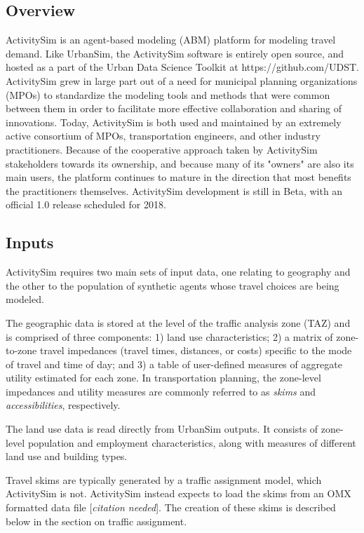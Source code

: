 \subsection{Overview}

ActivitySim is an agent-based modeling (ABM) platform for modeling travel demand. Like UrbanSim, the ActivitySim software is entirely open source, and hosted as a part of the Urban Data Science Toolkit at  https://github.com/UDST. ActivitySim grew in large part out of a need for municipal planning organizations (MPOs) to standardize the modeling tools and methods that were common between them in order to facilitate more effective collaboration and sharing of innovations. Today, ActivitySim is both used and maintained by an extremely active consortium of MPOs, transportation engineers, and other industry practitioners. Because of the cooperative approach taken by ActivitySim stakeholders towards its ownership, and because many of its "owners" are also its main users, the platform continues to mature in the direction that most benefits the practitioners themselves. ActivitySim development is still in Beta, with an official 1.0 release scheduled for 2018.

\subsection{Inputs}

ActivitySim requires two main sets of input data, one relating to geography and the other to the population of synthetic agents whose travel choices are being modeled. 
    
The geographic data is stored at the level of the traffic analysis zone (TAZ) and is comprised of three components: 1) land use characteristics; 2) a matrix of zone-to-zone travel impedances (travel times, distances, or costs) specific to the mode of travel and time of day; and 3) a table of user-defined measures of aggregate utility estimated for each zone. In transportation planning, the zone-level impedances and utility measures are commonly referred to as \textit{skims} and \textit{accessibilities}, respectively. 

The land use data is read directly from UrbanSim outputs. It consists of zone-level population and employment characteristics, along with measures of different land use and building types.

Travel skims are typically generated by a traffic assignment model, which ActivitySim is not. ActivitySim instead expects to load the skims from an OMX formatted data file [\textit{citation needed}]. The creation of these skims is described below in the section on traffic assignment.


